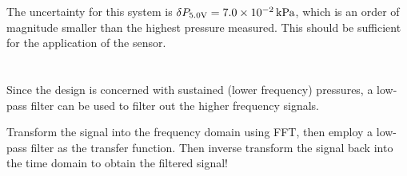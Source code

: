 The uncertainty for this system is $\delta P_{5.0\text{V}} = \qty{7.0E-2}{\kilo\pascal}$, which is an order of magnitude smaller than the 
highest pressure measured. This should be sufficient for the application of the sensor.

\section{}
Since the design is concerned with sustained (lower frequency) pressures, a low-pass filter can be used to filter out the higher frequency
signals. 

Transform the signal into the frequency domain using FFT, then employ a low-pass filter as the transfer function. Then 
inverse transform the signal back into the time domain to obtain the filtered signal!

